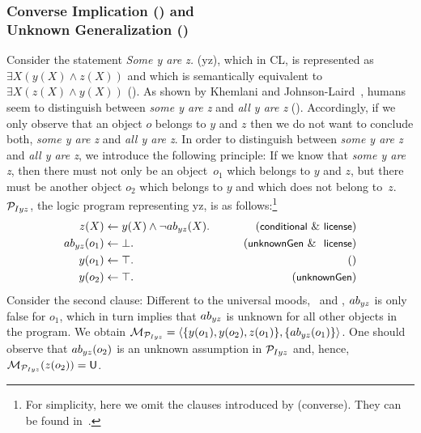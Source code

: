 \documentclass[12pt]{article}
\begin{document}
\subsubsection{Converse Implication (\converse) and \\ Unknown Generalization (\unknownGen)}
Consider the statement \textit{Some y are z.} ({\MI yz}), which in CL, is represented as $\exists X (y(X) \wedge z(X))$
and which is semantically equivalent to $\exists X(z(X) \wedge y(X))$ (\converse).
As shown by Khemlani and Johnson-Laird~\cite{khemlani:2012}, humans seem to
distinguish between \textit{some y are z} and \textit{all y are z} (\unknownGen).
Accordingly, if we only observe that an object $o$ belongs to $y$ and $z$ then we do not want to conclude both, \textit{some y are z} and \textit{all y are z}.
In order to distinguish between \textit{some y are z} and \textit{all y are z}, we introduce the following principle:  If we know that \textit{some y are z}, then there must not only be an object~$o_1$ which belongs to $y$ and $z$, but there must be another object $o_2$ which belongs to
$y$ and which does not belong to~$z$.
${\cal P}_{Iyz}$, the logic program representing \MI yz, is as follows:\footnote{For simplicity, here we omit the clauses introduced by ({\footnotesize\textsf{converse}}). They can be found in~\cite{declare:2017}.}
\begin{align}
z(X) & \leftarrow y(X) \wedge \neg \Ab_{yz}(X). & \tag{\conditionals\ \&\ \licenses}\\
\Ab_{yz}(o_1) & \leftarrow  \bot. & \tag{\unknownGen\ \& \ \licenses}\\
y(o_1) & \leftarrow  \top. & \tag{} \\
y(o_2) & \leftarrow  \top. & \tag{\unknownGen} 
\end{align}
Consider the second clause: Different to the universal moods, \ME\ and \MA, $ab_{yz}$ is only false for $o_1$, which in turn implies that 
$ab_{yz}$ is unknown for all other objects in the program.
We obtain ${\cal M}_{{\cal P}_{Iyz}}= \langle \{y(o_1), y(o_2), z(o_1)\}, \{ab_{yz}(o_1)\} \rangle$.
One should observe that  $ab_{yz}(o_2)$ is an unknown assumption in
${\cal P}_{Iyz}$ and,
hence, ${\cal M}_{{\cal P}_{Iyz}}(z(o_2)) = \mathsf{U}$.
\end{document}
